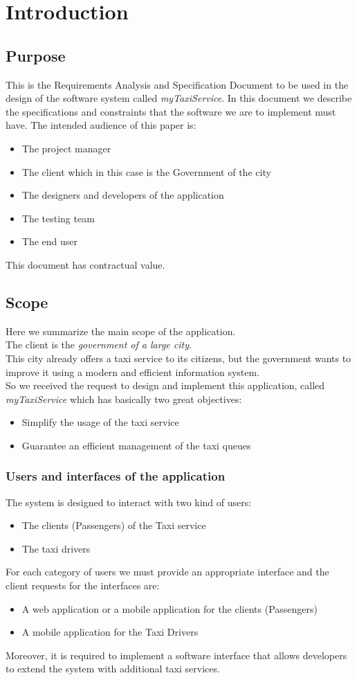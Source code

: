 \chapter{Introduction}

\section{Purpose}
This is the Requirements Analysis and Specification Document to be used in the design of the software system called \textit{myTaxiService}. In this document we describe the specifications and constraints that the software we are to implement must have.
The intended audience of this paper is:
\begin{itemize}
\item The project manager
\item The client which in this case is the Government of the city
\item The designers and developers of the application
\item The testing team
\item The end user
\end{itemize}
This document has contractual value.
\section{Scope}
Here we summarize the main scope of the application.\\
The client is the \textit{government of a large city}.\\
This city already offers a taxi service to its citizens, but the government wants to improve it using a modern and efficient information system.\\
So we received the request to design and implement this application, called \textit{myTaxiService} which has basically two great objectives:
\begin{itemize}
\item Simplify the usage of the taxi service
\item Guarantee an efficient management of the taxi queues
\end{itemize}
\subsection{Users and interfaces of the application}
The system is designed to interact with two kind of users:
\begin{itemize}
\item The clients (Passengers) of the Taxi service
\item The taxi drivers
\end{itemize}
For each category of users we must provide an appropriate interface and the client requests for the interfaces are:
\begin{itemize}
\item A web application or a mobile application for the clients (Passengers)
\item A mobile application for the Taxi Drivers
\end{itemize}
Moreover, it is required to implement a software interface that allows developers to extend the system with additional taxi services.
